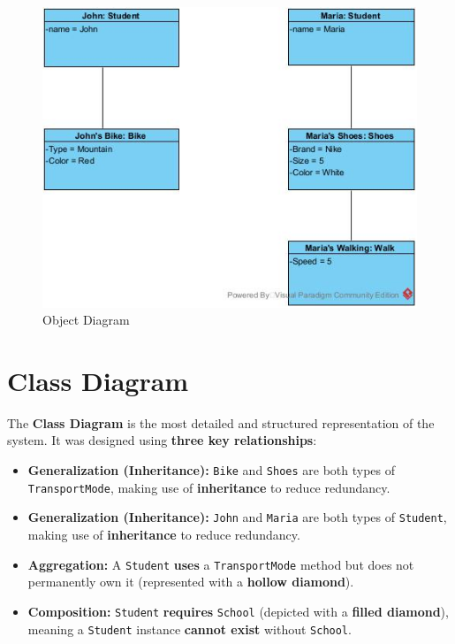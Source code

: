 \begin{figure}[H]
    \centering
    \includegraphics[scale=0.75]{Book-SSW565/jpg/ArchitectureModeling/Object Diagram1.jpg}
    \caption{\label{Figure::Object Diagram}Object Diagram}
\end{figure}

\section{Class Diagram}
The \textbf{Class Diagram} is the most detailed and structured representation of the system. It was designed using \textbf{three key relationships}:
\begin{itemize}
    \item \textbf{Generalization (Inheritance):} \texttt{Bike} and \texttt{Shoes} are both types of \texttt{TransportMode}, making use of \textbf{inheritance} to reduce redundancy.
    \item \textbf{Generalization (Inheritance):} \texttt{John} and \texttt{Maria} are both types of \texttt{Student}, making use of \textbf{inheritance} to reduce redundancy.
    \item \textbf{Aggregation:} A \texttt{Student} \textbf{uses} a \texttt{TransportMode} method but does not permanently own it (represented with a \textbf{hollow diamond}).
    \item \textbf{Composition:} \texttt{Student} \textbf{requires} \texttt{School} (depicted with a \textbf{filled diamond}), meaning a \texttt{Student} instance \textbf{cannot exist} without \texttt{School}.
\end{itemize}

